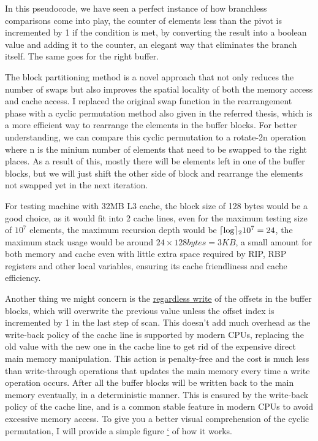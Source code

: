 \documentclass{article}
\DeclarePairedDelimiter\ceil{\lceil}{\rceil}
\begin{document}
In this pseudocode, we have seen a perfect instance of how branchless comparisons come into play, the counter of elements less than the pivot is incremented by 1 if the condition is met,
by converting the result into a boolean value and adding it to the counter, an elegant way that eliminates the branch itself. The same goes for the right buffer.

The block partitioning method is a novel approach that not only reduces the number of swaps but also improves the spatial locality of both the memory access and cache access.
I replaced the original swap function in the rearrangement phase with a cyclic permutation method also given in the referred thesis, which is a more efficient way to rearrange the elements in the buffer blocks.
For better understanding, we can compare this cyclic permutation to a rotate-2n operation where n is the minium number of elements that need to be swapped to the right places.
As a result of this, mostly there will be elements left in one of the buffer blocks, but we will just shift the other side of block and rearrange the elements not swapped yet in the next iteration.

For testing machine with 32MB L3 cache, the block size of 128 bytes would be a good choice, as it would fit into 2 cache lines, even for the maximum testing size of $10^7$ elements, the maximum recursion depth would be $\ceil\log_{2} 10^7 = 24$,
the maximum stack usage would be around $24 \times 128bytes = 3KB$, a small amount for both memory and cache even with little extra space required by RIP, RBP registers and other local variables, ensuring its cache friendliness and cache efficiency.

Another thing we might concern is the \hyperlink{RegardlessWrite}{regardless write} of the offsets in the buffer blocks, which will overwrite the previous value unless the offset index is incremented by 1 in the last step of scan.
This doesn't add much overhead as the write-back policy of the cache line is supported by modern CPUs, replacing the old value with the new one in the cache line to get rid of the expensive 
direct main memory manipulation. This action is penalty-free and the cost is much less than write-through operations that updates the main memory every time a write operation occurs.
After all the buffer blocks will be written back to the main memory eventually, in a deterministic manner.
This is ensured by the write-back policy of the cache line, and is a common stable feature in modern CPUs to avoid excessive memory access.
To give you a better visual comprehension of the cyclic permutation, I will provide a simple figure \hyperlink{fig:cyclicpermu}{`} of how it works.
\end{document}
